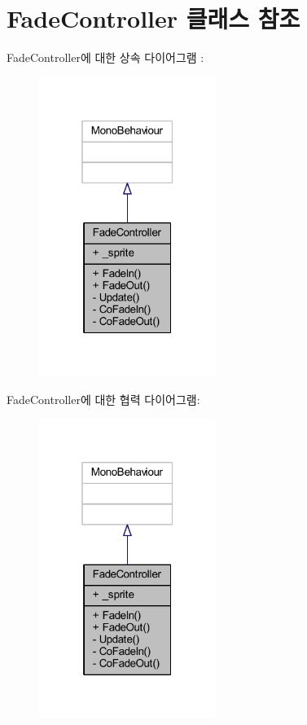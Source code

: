 \hypertarget{class_fade_controller}{}\section{Fade\+Controller 클래스 참조}
\label{class_fade_controller}


Fade\+Controller에 대한 상속 다이어그램 \+: \nopagebreak
\begin{figure}[H]
\begin{center}
\leavevmode
\includegraphics[width=163pt]{d6/d9c/class_fade_controller__inherit__graph}
\end{center}
\end{figure}


Fade\+Controller에 대한 협력 다이어그램\+:\nopagebreak
\begin{figure}[H]
\begin{center}
\leavevmode
\includegraphics[width=163pt]{dd/df8/class_fade_controller__coll__graph}
\end{center}
\end{figure}

